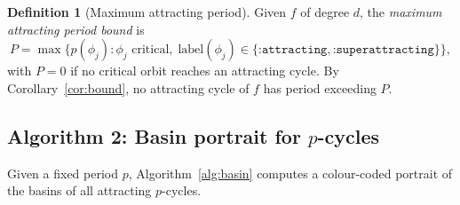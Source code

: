 \documentclass[12pt]{article}
\theoremstyle{definition}
\newtheorem{definition}[theorem]{Definition}
\begin{document}
\begin{definition}[Maximum attracting period]\label{def:P}
Given $f$ of degree $d$, the \emph{maximum attracting period bound} is
\[
  P = \max\bigl\{p(\phi_j) : \phi_j\text{ critical},\;
                 \mathrm{label}(\phi_j)\in\{
                 \texttt{:attracting},\texttt{:superattracting}\}\bigr\},
\]
with $P=0$ if no critical orbit reaches an attracting cycle.  By
Corollary~\ref{cor:bound}, no attracting cycle of $f$ has period
exceeding $P$.
\end{definition}

\subsection{Algorithm 2: Basin portrait for $p$-cycles}

Given a fixed period $p$, Algorithm~\ref{alg:basin} computes a colour-coded
portrait of the basins of all attracting $p$-cycles.
\end{document}
